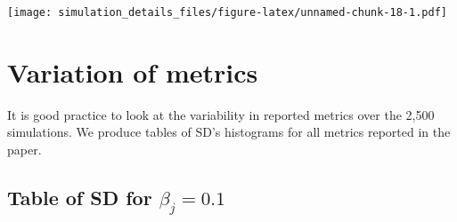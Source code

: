 \documentclass[
]{article}
\begin{document}
\texttt{[image: simulation\_details\_files/figure-latex/unnamed-chunk-18-1.pdf]}

\hypertarget{variation-of-metrics}{%
\section{Variation of metrics}\label{variation-of-metrics}}

It is good practice to look at the variability in reported metrics over
the 2,500 simulations. We produce tables of SD's histograms for all
metrics reported in the paper.

\hypertarget{table-of-sd-for-beta_j-0.1}{%
\subsection{\texorpdfstring{Table of SD for
\(\beta_j = 0.1\)}{Table of SD for \textbackslash beta\_j = 0.1}}\label{table-of-sd-for-beta_j-0.1}}
\end{document}
